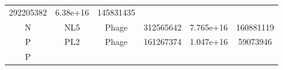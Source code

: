 \documentclass[]{article}
\begin{document}
\begin{longtable}[]{@{}cccccc@{}}
\begin{minipage}[t]{0.12\columnwidth}
292205382
\strut\end{minipage} &
\begin{minipage}[t]{0.12\columnwidth}\centering\strut
6.38e+16
\strut\end{minipage} &
\begin{minipage}[t]{0.12\columnwidth}\centering\strut
145831435
\strut\end{minipage}\tabularnewline
\begin{minipage}[t]{0.07\columnwidth}\centering\strut
N
\strut\end{minipage} &
\begin{minipage}[t]{0.07\columnwidth}\centering\strut
NL5
\strut\end{minipage} &
\begin{minipage}[t]{0.12\columnwidth}\centering\strut
Phage
\strut\end{minipage} &
\begin{minipage}[t]{0.12\columnwidth}\centering\strut
312565642
\strut\end{minipage} &
\begin{minipage}[t]{0.12\columnwidth}\centering\strut
7.765e+16
\strut\end{minipage} &
\begin{minipage}[t]{0.12\columnwidth}\centering\strut
160881119
\strut\end{minipage}\tabularnewline
\begin{minipage}[t]{0.07\columnwidth}\centering\strut
P
\strut\end{minipage} &
\begin{minipage}[t]{0.07\columnwidth}\centering\strut
PL2
\strut\end{minipage} &
\begin{minipage}[t]{0.12\columnwidth}\centering\strut
Phage
\strut\end{minipage} &
\begin{minipage}[t]{0.12\columnwidth}\centering\strut
161267374
\strut\end{minipage} &
\begin{minipage}[t]{0.12\columnwidth}\centering\strut
1.047e+16
\strut\end{minipage} &
\begin{minipage}[t]{0.12\columnwidth}\centering\strut
59073946
\strut\end{minipage}\tabularnewline
\begin{minipage}[t]{0.07\columnwidth}\centering\strut
P
\strut\end{minipage} &
\begin{minipage}[t]{0.07\columnwidth}\centering\strut

\end{minipage}
\end{longtable}
\end{document}
